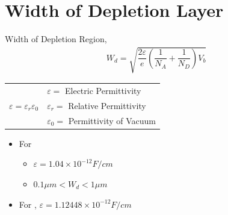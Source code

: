 \documentclass[a4aper,12pt]{report}
\begin{document}
\section{Width of Depletion Layer}
Width of Depletion Region,
\begin{align*}
    W_d = \sqrt{\dfrac{2\varepsilon}{e}\left(\dfrac{1}{N_A}+\dfrac{1}{N_D}\right)V_b}
\end{align*}
\begin{center}\hspace*{3.3cm}
    \begin{tabular}{c|l}
        \multirow{3}{*}{$\varepsilon = \varepsilon_r\varepsilon_0$} & $\varepsilon = $ Electric Permittivity \\
        & $\varepsilon_r = $ Relative Permittivity \\
        & $\varepsilon_0 = $ Permittivity of Vacuum 
    \end{tabular}
\end{center}
\begin{itemize}
    \item For \begin{itemize}\vspace*{-7pt}
        \item $\varepsilon = 1.04\times 10^{-12}F/cm$
        \item $0.1\mu m < W_d < 1\mu m$
    \end{itemize}
    \item For , $\varepsilon = 1.12448\times 10^{-12}F/cm$
\end{itemize}
\vspace*{8pt}
\end{document}
